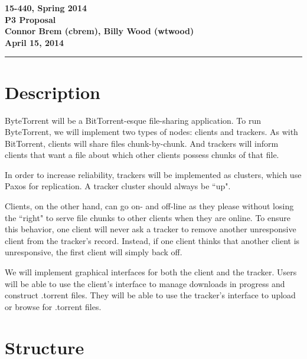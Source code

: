 \documentclass[12pt]{article}
\newcommand{\assignment}{P3 Proposal}
\newcommand{\duedate}{April 15, 2014}
\newcommand{\header}{\noindent \textbf{15-440, Spring 2014 \\ \assignment \\ 
                     Connor Brem (cbrem), Billy Wood (wtwood) \\ \duedate} 
                     \vspace{0.10in} \hrule}
\begin{document}
\header


\section*{Description}

ByteTorrent will be a BitTorrent-esque file-sharing application.
To run ByteTorrent, we will implement two types of nodes: clients and trackers.
As with BitTorrent, clients will share files chunk-by-chunk. And trackers will
inform clients that want a file about which other clients possess chunks of
that file.

In order to increase reliability, trackers will be implemented as clusters,
which use Paxos for replication. A tracker cluster should always be ``up".

Clients, on the other hand, can go on- and off-line as they please without
losing the ``right" to serve file chunks to other clients when they are online.
To ensure this behavior, one client will never ask a tracker to remove another
unresponsive client from the tracker's record. Instead, if one client thinks
that another client is unresponsive, the first client will simply back off.

We will implement graphical interfaces for both the client and the tracker.
Users will be able to use the client's interface to manage downloads in
progress and construct .torrent files. They will be able to use the tracker's
interface to upload or browse for .torrent files.


\section*{Structure}
\end{document}
